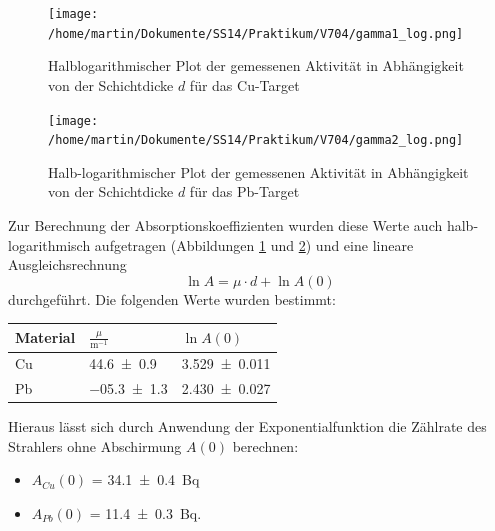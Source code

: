 \documentclass[11pt,ngerman,a4paper]{article}
\begin{document}
\begin{figure}[H]
\centering
\texttt{[image: /home/martin/Dokumente/SS14/Praktikum/V704/gamma1\_log.png]}
\caption{Halblogarithmischer Plot der gemessenen Aktivität in Abhängigkeit von der Schichtdicke $d$ für das Cu-Target}
\label{abb_gamma1_log}
\end{figure}
\begin{figure}[H]
\centering
\texttt{[image: /home/martin/Dokumente/SS14/Praktikum/V704/gamma2\_log.png]}
\caption{Halb-logarithmischer Plot der gemessenen Aktivität in Abhängigkeit von der Schichtdicke $d$ für das Pb-Target}
\label{abb_gamma2_log}
\end{figure}
\noindent
Zur Berechnung der Absorptionskoeffizienten wurden diese Werte auch halb-logarithmisch aufgetragen (Abbildungen \ref{abb_gamma1_log}  und \ref{abb_gamma2_log}) und eine lineare Ausgleichsrechnung 
\[
\ln{A} = \mu \cdot d + \ln{A(0)}
\]
durchgeführt. Die folgenden Werte wurden bestimmt:
\begin{table}[h]
\centering
\begin{tabular}{lll}

\toprule
	Material & $\frac{\mu}{\si{\meter^{-1}}} $& $\ln{A(0)}$ \\
 \midrule 
 	Cu & \num{44.6+-0.9} & \num{3.529+-0.011}\\
	Pb & \num{-05.3+-1.3}  & \num{2.430+-0.027}\\

\bottomrule
\end{tabular}
\end{table}

\noindent
Hieraus lässt sich durch Anwendung der Exponentialfunktion die Zählrate des Strahlers ohne Abschirmung $A(0)$ berechnen:
\begin{itemize}
\item $A_{Cu}(0)$ = \SI{34.1+-0.4}{\becquerel}
\item $A_{Pb}(0)$ = \SI{11.4+-0.3 }{\becquerel}.

\end{itemize}
\end{document}
